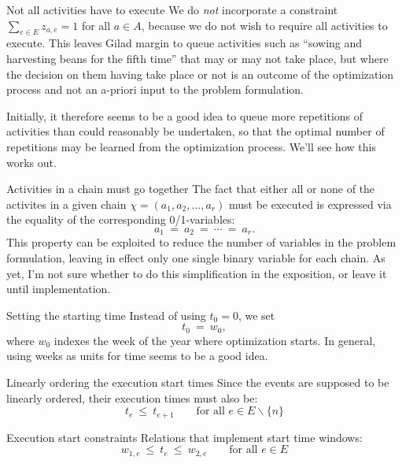 \documentclass[11pt,reqno]{amsart}
\numberwithin{equation}{section}
\begin{document}
\begin{mydesc}

\item[Not all activities have to execute] We do \emph{not} incorporate a constraint
  $\sum_{e\in E} z_{a,e}=1$ for all $a\in A$, because we do not wish to require all
  activities to execute. This leaves Gilad margin to queue activities such as ``sowing and
  harvesting beans for the fifth time'' that may or may not take place, but where the
  decision on them having take place or not is an outcome of the optimization process and
  not an a-priori input to the problem formulation.

  Initially, it therefore seems to be a good idea to queue more repetitions of activities
  than could reasonably be undertaken, so that the optimal number of repetitions may be
  learned from the optimization process. We'll see how this works out.

\item[Activities in a chain must go together] The fact that either all or none of the
  activites in a given chain $\chi=(a_1,a_2,\dots,a_r)$ must be executed is expressed via
  the equality of the corresponding 0/1-variables:
  \begin{equation}
    a_1 \ = \ a_2 \ = \ \cdots \ = \ a_r.
  \end{equation}
  This property can be exploited to reduce the number of variables in the problem
  formulation, leaving in effect only one single binary variable for each chain. As yet,
  I'm not sure whether to do this simplification in the exposition, or leave it until
  implementation. 

\item[Setting the starting time] Instead of using $t_0=0$, we set
  \begin{equation}
     t_0
     \ = \
     w_0,
  \end{equation}
  where $w_0$ indexes the week of the year where optimization starts. In general, using
  weeks as units for time seems to be a good idea.

\item[Linearly ordering the execution start times] Since the events are supposed to be linearly
  ordered,  their execution times must also be:
  \begin{equation}
     t_e 
     \ \le \
     t_{e+1}
     \qquad\text{for all }
      e\in E\smallsetminus\{n\}
  \end{equation}

\item[Execution start constraints] Relations that implement start time windows:
  \begin{equation}
    w_{1,e}\ \le\ t_e \ \le \ w_{2,e}
    \qquad\text{for all } e\in E
  \end{equation}
  


\end{mydesc}
\end{document}
